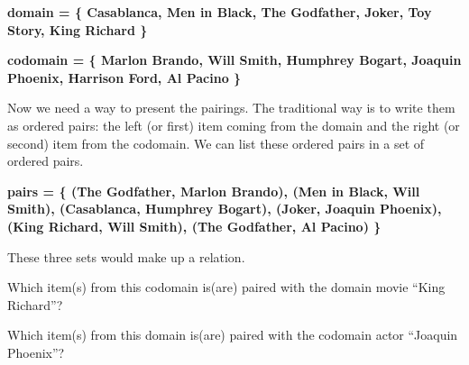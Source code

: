 \documentclass{ximera}
\begin{document}
\begin{center} 
\textbf{\textcolor{blue!75!black}{ domain = \{ Casablanca, Men in Black,  The Godfather, Joker, Toy Story, King Richard \} }}
\end{center}

\begin{center} 
\textbf{\textcolor{blue!75!black}{ codomain = \{ Marlon Brando, Will Smith, Humphrey Bogart, Joaquin Phoenix, Harrison Ford, Al Pacino \} }}
\end{center}

Now we need a way to present the pairings.  The traditional way is to write them as ordered pairs: the left (or first) item coming from the domain and the right (or second) item from the codomain.  We can list these ordered pairs in a set of ordered pairs. 

\begin{center} 
\textbf{\textcolor{blue!75!black}{ pairs = \{ (The Godfather, Marlon Brando), (Men in Black, Will Smith), (Casablanca, Humphrey Bogart), (Joker, Joaquin Phoenix), (King Richard, Will Smith), (The Godfather, Al Pacino) \}  }}
\end{center}


These three sets would make up a relation. 



\begin{question}

Which item(s) from this codomain is(are) paired with the domain movie ``King Richard''?
\begin{selectAll}
\end{selectAll}

\end{question}



\begin{question}

Which item(s) from this domain is(are) paired with the codomain actor ``Joaquin Phoenix''?
\begin{selectAll}
\end{selectAll}

\end{question}
\end{document}
